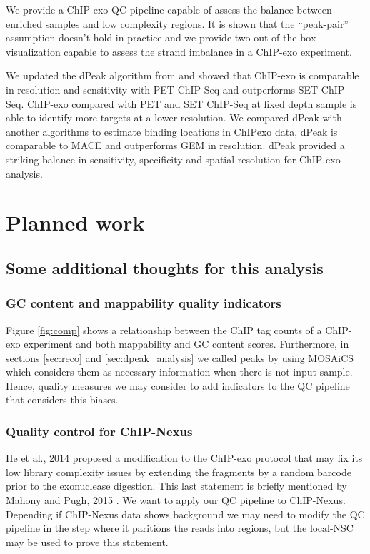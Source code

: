\documentclass[11pt]{article}\usepackage[]{graphicx}\usepackage[]{color}
\begin{document}
We provide a ChIP-exo QC pipeline capable of assess the balance between
enriched samples and low complexity regions. It is shown that the
``peak-pair'' assumption doesn't hold in practice and we provide two
out-of-the-box visualization capable to assess the strand imbalance in
a ChIP-exo experiment.

We updated the dPeak algorithm from \cite{dpeak} and showed that
ChIP-exo is comparable in resolution and sensitivity with PET ChIP-Seq
and outperforms SET ChIP-Seq. ChIP-exo compared with PET and SET
ChIP-Seq at fixed depth sample is able to identify more targets at a
lower resolution. We compared dPeak with another algorithms to
estimate binding locations in ChIPexo data, dPeak is comparable to
MACE and outperforms GEM in resolution. dPeak provided a striking
balance in sensitivity, specificity and spatial resolution for
ChIP-exo analysis.


\newpage


\section{Planned work}
\label{sec:future}

\subsection{Some additional thoughts for this analysis}

\subsubsection{GC content and mappability quality indicators}
\label{sec:gc_map_qc}

Figure \ref{fig:comp} shows a relationship between the ChIP tag counts
of a ChIP-exo experiment and both mappability and GC content
scores. Furthermore, in sections \ref{sec:reco} and
\ref{sec:dpeak_analysis} we called peaks by using MOSAiCS which
considers them as necessary information when there is not input
sample. Hence, quality measures we may consider to add indicators to
the QC pipeline that considers this biases.

\subsubsection{Quality control for ChIP-Nexus}
\label{sec:nexus}

He et al., 2014 \cite{chipnexus} proposed a modification to the
ChIP-exo protocol that may fix its low library complexity issues by
extending the fragments by a random barcode prior to the exonuclease
digestion. This last statement is briefly mentioned by Mahony and
Pugh, 2015 \cite{exo_review}. We want to apply our QC pipeline to
ChIP-Nexus. Depending if ChIP-Nexus data shows background we may need
to modify the QC pipeline in the step where it paritions the reads
into regions, but the $\mbox{local-NSC}$ may be used to prove this
statement.
\end{document}
